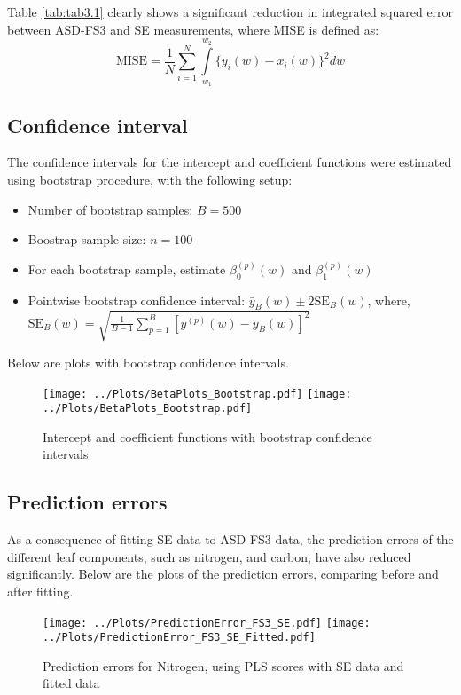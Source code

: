 Table \ref{tab:tab3.1} clearly shows a significant reduction in integrated squared error between ASD-FS3 and SE measurements, where MISE is defined as:
\begin{equation}
\text{MISE} = \frac{1}{N} \sum \limits_{i = 1} ^{N} \int\limits_{w_1}^{w_2} \{y_i(w) - x_i(w)\}^2dw
\end{equation}

\subsection*{Confidence interval}
The confidence intervals for the intercept and coefficient functions were estimated using bootstrap procedure, with the following setup:
\begin{itemize}
\item Number of bootstrap samples: $B = 500$
\item Boostrap sample size: $n = 100$
\item For each bootstrap sample, estimate $\beta_0^{(p)}(w)$ and $\beta_1^{(p)}(w)$
\item Pointwise bootstrap confidence interval: $\bar{y}_B(w) \pm 2\text{SE}_B(w)$, where, \\
$\text{SE}_B(w) = \sqrt{\frac{1}{B - 1} \sum\limits_{p = 1}^B [y^{(p)}(w) - \bar{y}_B(w)]^2}$
\end{itemize}
Below are plots with bootstrap confidence intervals.
\begin{figure}[H]
\centering
\texttt{[image: ../Plots/BetaPlots\_Bootstrap.pdf]}
\hspace{0.5cm}
\texttt{[image: ../Plots/BetaPlots\_Bootstrap.pdf]}
\caption{Intercept and coefficient functions with bootstrap confidence intervals}
\label{fig:Fig3.4}
\end{figure}


\subsection*{Prediction errors}
As a consequence of fitting SE data to ASD-FS3 data, the prediction errors of the different leaf components, such as nitrogen, and carbon, have also reduced significantly. Below are the plots of the prediction errors, comparing before and after fitting. 

\begin{figure}[H]
\centering
\texttt{[image: ../Plots/PredictionError\_FS3\_SE.pdf]}
\texttt{[image: ../Plots/PredictionError\_FS3\_SE\_Fitted.pdf]}
\caption{Prediction errors for Nitrogen, using PLS scores with SE data and fitted data}
\label{fig:Fig3.5}
\end{figure}

